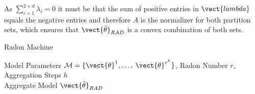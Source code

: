 As $\sum_{i=1}^{2+d} \lambda_i = 0$ it must be that the sum of positive entries in $\vect{lambda}$ equals the negative entries and therefore $A$ is the normalizer for both partition sets, which ensures that $\vect{\bar{\theta}}_{RAD}$ is a convex combination of both sets.

\begin{algo}{Radon Machine}
    \begin{algorithm}[H]
    \caption[Radon Machine for parallelized model aggregation for exponential family models]{Radon Machine for parallelized model aggregation for exponential family models. Each iteration consists of 1) Obtaining the coefficients for the convex combination of parameters and 2) computing the center point as the convex combination. In the last step we only have a single set of $r$ parameter vectors that has to be aggregated to obtain the final result. In case of linear dependencies between parameter vectors we use the least squares optimization instead.}
        \begin{algorithmic}[1]
            \label{alg:radon}
            \REQUIRE Model Parameters $\mathcal{M} = \{\vect{\theta}^1, \ldots,\: \vect{\theta}^{r^{h}}\}$, Radon Number $r$, Aggregation Steps $h$ \\
            \ENSURE Aggregate Model $\vect{\tilde{\theta}}_{RAD}$  \\
                \ELSE
                \ENDIF
            \ENDIF
\end{algorithmic}
\end{algorithm}
\end{algo}
